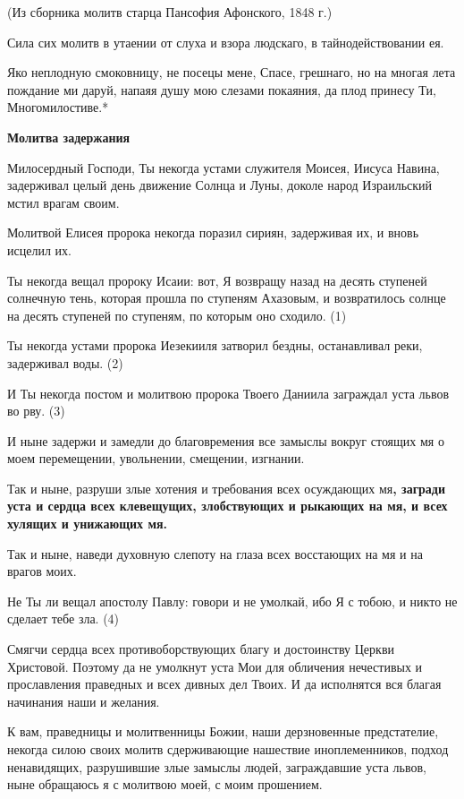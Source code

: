 (Из сборника молитв старца Пансофия Афонского, 1848 г.)

Сила сих молитв в утаении от слуха и взора людскаго, в тайнодействовании ея.

\normalfont{}

Яко неплодную смоковницу, не посецы мене, Спасе, грешнаго, но на многая лета пождание ми даруй, напаяя душу мою слезами покаяния, да плод принесу Ти, Многомилостиве.*


\bfseries Молитва задержания

\normalfont{}


Милосердный Господи, Ты некогда устами служителя Моисея, Иисуса Навина, задерживал целый день движение Солнца и Луны, доколе народ Израильский мстил врагам своим. 

Молитвой Елисея пророка некогда поразил сириян, задерживая их, и вновь исцелил их.

Ты некогда вещал пророку Исаии: вот, Я возвращу назад на десять ступеней солнечную тень, которая прошла по ступеням Ахазовым, и возвратилось солнце на десять ступеней по ступеням, по которым оно сходило. (1)

Ты некогда устами пророка Иезекииля затворил бездны, останавливал реки, задерживал воды. (2)

И Ты некогда постом и молитвою пророка Твоего Даниила заграждал уста львов во рву. (3)

И ныне задержи и замедли до благовремения все замыслы вокруг стоящих мя о моем перемещении, увольнении, смещении, изгнании. 

Так и ныне, разруши злые хотения и требования всех осуждающих мя\bfseries  \normalfont{}, загради уста и сердца всех клевещущих, злобствующих и рыкающих на мя, и всех хулящих и унижающих мя.

Так и ныне, наведи духовную слепоту на глаза всех восстающих на мя и на врагов моих.

Не Ты ли вещал апостолу Павлу: говори и не умолкай, ибо Я с тобою, и никто не сделает тебе зла. (4)

Смягчи сердца всех противоборствующих благу и достоинству Церкви Христовой. Поэтому да не умолкнут уста Мои для обличения нечестивых и прославления праведных и всех дивных дел Твоих. И да исполнятся вся благая начинания наши и желания. 


К вам, праведницы и молитвенницы Божии, наши дерзновенные предстателие, некогда силою своих молитв сдерживающие нашествие иноплеменников, подход ненавидящих, разрушившие злые замыслы людей, заграждавшие уста львов, ныне обращаюсь я с молитвою моей, с моим прошением.


